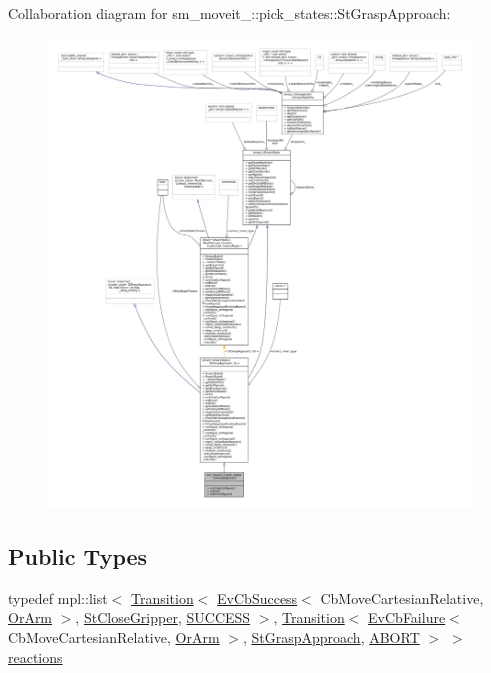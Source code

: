 Collaboration diagram for sm\+\_\+moveit\+\_\+:\+:pick\+\_\+states\+:\+:St\+Grasp\+Approach\+:
\nopagebreak
\begin{figure}[H]
\begin{center}
\leavevmode
\includegraphics[width=350pt]{structsm__moveit__4_1_1pick__states_1_1StGraspApproach__coll__graph}
\end{center}
\end{figure}
\subsection*{Public Types}
\begin{DoxyCompactItemize}
\item 
typedef mpl\+::list$<$ \hyperlink{classsmacc_1_1Transition}{Transition}$<$ \hyperlink{structsmacc_1_1EvCbSuccess}{Ev\+Cb\+Success}$<$ Cb\+Move\+Cartesian\+Relative, \hyperlink{classsm__moveit__4_1_1OrArm}{Or\+Arm} $>$, \hyperlink{structsm__moveit__4_1_1pick__states_1_1StCloseGripper}{St\+Close\+Gripper}, \hyperlink{structsmacc_1_1default__transition__tags_1_1SUCCESS}{S\+U\+C\+C\+E\+SS} $>$, \hyperlink{classsmacc_1_1Transition}{Transition}$<$ \hyperlink{structsmacc_1_1EvCbFailure}{Ev\+Cb\+Failure}$<$ Cb\+Move\+Cartesian\+Relative, \hyperlink{classsm__moveit__4_1_1OrArm}{Or\+Arm} $>$, \hyperlink{structsm__moveit__4_1_1pick__states_1_1StGraspApproach}{St\+Grasp\+Approach}, \hyperlink{structsmacc_1_1default__transition__tags_1_1ABORT}{A\+B\+O\+RT} $>$ $>$ \hyperlink{structsm__moveit__4_1_1pick__states_1_1StGraspApproach_aac5e47f890c8f87966602b2a034d7541}{reactions}
\end{DoxyCompactItemize}
